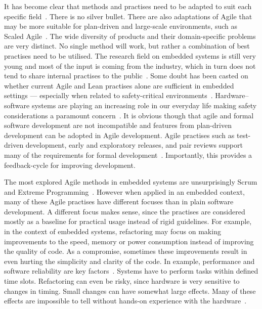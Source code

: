 \documentclass[english]{tktltiki2}
\begin{document}
It has become clear that methods and practises need to be adapted to suit each specific field~\cite{VB09, CWR10, HMP12, JLP12, KRM13}. There is no silver bullet. There are also adaptations of Agile that may be more suitable for plan-driven and large-scale environments, such as Scaled Agile~\cite{ScaledAgile}. The wide diversity of products and their domain-specific problems are very distinct. No single method will work, but rather a combination of best practises need to be utilised. The research field on embedded systems is still very young and most of the input is coming from the industry, which in turn does not tend to share internal practises to the public~\cite{KRM13}. Some doubt has been casted on whether current Agile and Lean practises alone are sufficient in embedded settings — especially when related to safety-critical environments~\cite{TFR02, EB12}. Hardware–software systems are playing an increasing role in our everyday life making safety considerations a paramount concern~\cite{CWR10}. It is obvious though that agile and formal software development are not incompatible and features from plan-driven development can be adopted in Agile development. Agile practises such as test-driven development, early and exploratory releases, and pair reviews support many of the requirements for formal development~\cite{TFR02, VB09, CWR10, JLP12}. Importantly, this provides a feedback-cycle for improving development.

The most explored Agile methods in embedded systems are unsurprisingly Scrum and Extreme Programming~\cite{KRM13}. However when applied in an embedded context, many of these Agile practises have different focuses than in plain software development. A different focus makes sense, since the practises are considered mostly as a baseline for practical usage instead of rigid guidelines. For example, in the context of embedded systems, refactoring may focus on making improvements to the speed, memory or power consumption instead of improving the quality of code. As a compromise, sometimes these improvements result in even hurting the simplicity and clarity of the code. In example, performance and software reliability are key factors~\cite{RA03, EHS14}. Systems have to perform tasks within defined time slots. Refactoring can even be risky, since hardware is very sensitive to changes in timing. Small changes can have somewhat large effects. Many of these effects are impossible to tell without hands-on experience with the hardware~\cite{RA03}.
\end{document}
